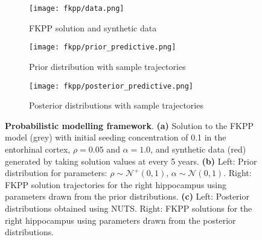 \begin{figure}[h]
    \centering
    \begin{subfigure}[b]{0.8\textwidth}
        \centering
        \texttt{[image: fkpp/data.png]}
        \caption{FKPP solution and synthetic data}
        \label{fig:fkpp-data}
    \end{subfigure}
    \begin{subfigure}[b]{0.8\textwidth}
        \centering
        \texttt{[image: fkpp/prior\_predictive.png]}
        \caption{Prior distribution with sample trajectories}
        \label{fig:fkpp-prior}
    \end{subfigure}
    \begin{subfigure}[b]{0.8\textwidth}
        \centering
        \texttt{[image: fkpp/posterior\_predictive.png]}
        \caption{Posterior distributions with sample trajectories}
        \label{fig:fkpp-posterior}
    \end{subfigure}    

    \caption{\textbf{Probabilistic modelling framework}. \textbf{(a)} Solution to the FKPP model (grey) with initial 
    seeding concentration of 0.1 in the entorhinal cortex, $\rho = 0.05$ and $\alpha = 1.0$, and 
    synthetic data (red) generated by taking solution values at every 5 years. \textbf{(b)} Left: Prior distribution for 
    parameters: $\rho \sim \mathcal{N}^+(0, 1)$, $\alpha \sim \mathcal{N}(0,1)$. Right: FKPP 
    solution trajectories for the right hippocampus using parameters drawn from the prior distributions.
    \textbf{(c)} Left: Posterior distributions obtained using NUTS. Right: FKPP solutions for the right hippocampus 
    using parameters drawn from the posterior distributions.}
        \label{fig:fkpp-bayes}
\end{figure}

